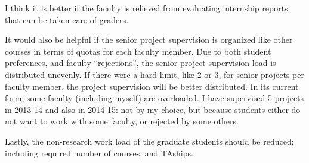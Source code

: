 

I think it is better if the faculty is relieved from evaluating internship reports that can be taken care of graders. 

It would also be helpful if the senior project supervision is organized like other courses in terms of quotas for each faculty member. Due to both student preferences, and faculty ``rejections'', the senior project supervision load is distributed unevenly. If there were a hard limit, like 2 or 3, for senior projects per faculty member, the project supervision will be better distributed. In its current form, some faculty (including myself) are overloaded. I have supervised 5 projects in 2013-14 and also in 2014-15: not by my choice, but because students either do not want to work with some faculty, or rejected by some others. 


Lastly, the non-research work load of the graduate students should be reduced; including required number of courses, and TAships.



